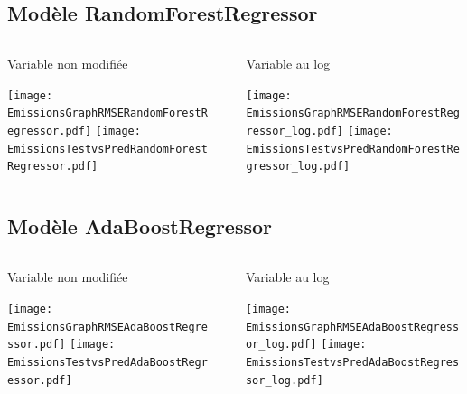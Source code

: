 \documentclass[8pt,aspectratio=169,hyperref={unicode=true}]{beamer}
\begin{document}
\subsection{Modèle RandomForestRegressor}
\begin{frame}[t]{\insertsubsection}
  \begin{columns}
    \begin{column}{.33\textwidth}
      {\centering Variable non modifiée

      }
      \texttt{[image: EmissionsGraphRMSERandomForestRegressor.pdf]}
      \texttt{[image: EmissionsTestvsPredRandomForestRegressor.pdf]}
    \end{column}
    \begin{column}{.33\textwidth}

    \end{column}
    \begin{column}{.33\textwidth}
      {\centering Variable au log

      }
      \texttt{[image: EmissionsGraphRMSERandomForestRegressor\_log.pdf]}
      \texttt{[image: EmissionsTestvsPredRandomForestRegressor\_log.pdf]}
    \end{column}
  \end{columns}
\end{frame}

\subsection{Modèle AdaBoostRegressor}
\begin{frame}[t]{\insertsubsection}
  \begin{columns}
    \begin{column}{.33\textwidth}
      {\centering Variable non modifiée

      }
      \texttt{[image: EmissionsGraphRMSEAdaBoostRegressor.pdf]}
      \texttt{[image: EmissionsTestvsPredAdaBoostRegressor.pdf]}
    \end{column}
    \begin{column}{.33\textwidth}

    \end{column}
    \begin{column}{.33\textwidth}
      {\centering Variable au log

      }
      \texttt{[image: EmissionsGraphRMSEAdaBoostRegressor\_log.pdf]}
      \texttt{[image: EmissionsTestvsPredAdaBoostRegressor\_log.pdf]}
    \end{column}
  \end{columns}
\end{frame}
\end{document}
